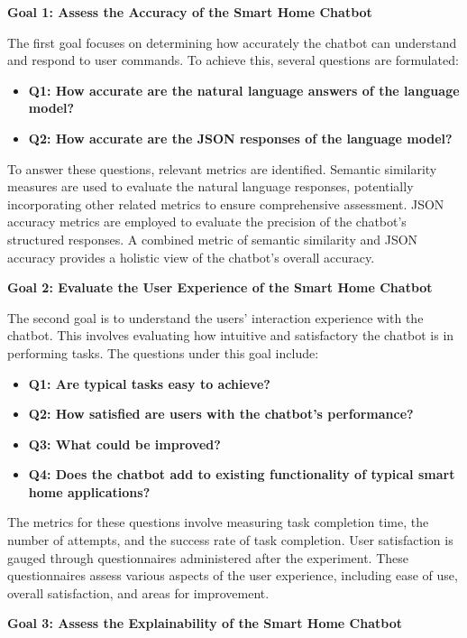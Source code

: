 \textbf{Goal 1: Assess the Accuracy of the Smart Home Chatbot}

The first goal focuses on determining how accurately the chatbot can understand and respond to user commands. To achieve this, several questions are formulated:

\begin{itemize}
    \item \textbf{Q1: How accurate are the natural language answers of the language model?}
    \item \textbf{Q2: How accurate are the JSON responses of the language model?}
\end{itemize}

To answer these questions, relevant metrics are identified. Semantic similarity measures are used to evaluate the natural language responses, potentially incorporating other related metrics to ensure comprehensive assessment. JSON accuracy metrics are employed to evaluate the precision of the chatbot's structured responses. A combined metric of semantic similarity and JSON accuracy provides a holistic view of the chatbot's overall accuracy.

\textbf{Goal 2: Evaluate the User Experience of the Smart Home Chatbot}

The second goal is to understand the users' interaction experience with the chatbot. This involves evaluating how intuitive and satisfactory the chatbot is in performing tasks. The questions under this goal include:

\begin{itemize}
    \item \textbf{Q1: Are typical tasks easy to achieve?}
    \item \textbf{Q2: How satisfied are users with the chatbot's performance?}
    \item \textbf{Q3: What could be improved?}
    \item \textbf{Q4: Does the chatbot add to existing functionality of typical smart home applications?}
\end{itemize}

The metrics for these questions involve measuring task completion time, the number of attempts, and the success rate of task completion. User satisfaction is gauged through questionnaires administered after the experiment. These questionnaires assess various aspects of the user experience, including ease of use, overall satisfaction, and areas for improvement.

\textbf{Goal 3: Assess the Explainability of the Smart Home Chatbot}

